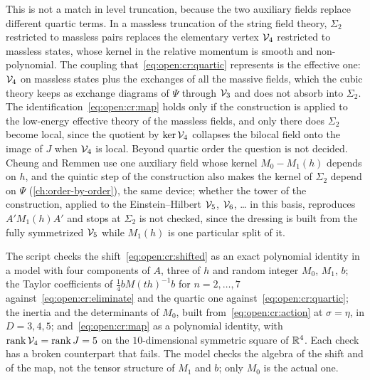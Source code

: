 This is not a match in level truncation, because the two auxiliary fields replace different quartic terms.
In a massless truncation of the string field theory, $\Sigma_2$ restricted to massless pairs replaces the elementary vertex $\mathcal{V}_{4}$ restricted to massless states, whose kernel in the relative momentum is smooth and non-polynomial.
The coupling that~\eqref{eq:open:cr:quartic} represents is the effective one: $\mathcal{V}_{4}$ on massless states plus the exchanges of all the massive fields, which the cubic theory keeps as exchange diagrams of $\Psi$ through $\mathcal{V}_{3}$ and does not absorb into $\Sigma_2$.
The identification~\eqref{eq:open:cr:map} holds only if the construction is applied to the low-energy effective theory of the massless fields, and only there does $\Sigma_2$ become local, since the quotient by $\ker \mathcal{V}_{4}$ collapses the bilocal field onto the image of $J$ when $\mathcal{V}_{4}$ is local.
Beyond quartic order the question is not decided.
Cheung and Remmen use one auxiliary field whose kernel $M_0 - M_1(h)$ depends on $h$, and the quintic step of the construction also makes the kernel of $\Sigma_2$ depend on $\Psi$ (\cref{ch:order-by-order}), the same device; whether the tower of the construction, applied to the Einstein--Hilbert $\mathcal{V}_{5}$, $\mathcal{V}_{6}$, \ldots{} in this basis, reproduces $A' M_1(h) A'$ and stops at $\Sigma_2$ is not checked, since the dressing is built from the fully symmetrized $\mathcal{V}_{5}$ while $M_1(h)$ is one particular split of it.

The script checks the shift~\eqref{eq:open:cr:shifted} as an exact polynomial identity in a model with four components of $A$, three of $h$ and random integer $M_0$, $M_1$, $b$; the Taylor coefficients of $\tfrac{1}{4} b M(t h)^{-1} b$ for $n = 2, \dots, 7$ against~\eqref{eq:open:cr:eliminate} and the quartic one against~\eqref{eq:open:cr:quartic}; the inertia and the determinants of $M_0$, built from~\eqref{eq:open:cr:action} at $\sigma = \eta$, in $D = 3, 4, 5$; and~\eqref{eq:open:cr:map} as a polynomial identity, with $\operatorname{rank} \mathcal{V}_{4} = \operatorname{rank} J = 5$ on the $10$-dimensional symmetric square of $\mathbb{R}^4$.
Each check has a broken counterpart that fails.
The model checks the algebra of the shift and of the map, not the tensor structure of $M_1$ and $b$; only $M_0$ is the actual one.

